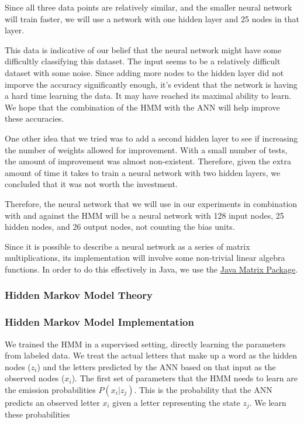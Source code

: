 \documentclass[11pt,a4paper,twocolumn]{article}
\begin{document}
Since all three data points are relatively similar, and the smaller neural
network will train faster, we will use a network with one hidden layer and 25 nodes
in that layer.

This data is indicative of our belief that the neural network might have some
difficultly classifying this dataset. The input seems to be a relatively
difficult dataset with some noise. Since adding more nodes to the hidden layer
did not imporve the accuracy significantly enough, it's evident that the
network is having a hard time learning the data. It may have reached its
maximal ability to learn. We hope that the combination of the HMM with the ANN
will help improve these accuracies.

One other idea that we tried was to add a second hidden layer to see if
increasing the number of weights allowed for improvement. With a small number
of tests, the amount of improvement was almost non-existent. Therefore, given
the extra amount of time it takes to train a neural network with two hidden
layers, we concluded that it was not worth the investment.

Therefore, the neural network that we will use in our experiments in
combination with and against the HMM will be a neural network with 128 input
nodes, 25 hidden nodes, and 26 output nodes, not counting the bias units.

Since it is possible to describe a neural network as a series of matrix multiplications, its
implementation will involve some non-trivial linear algebra functions. In order to do this
effectively in Java, we use the \href{http://math.nist.gov/javanumerics/jama/}{Java Matrix Package}.


\subsubsection*{Hidden Markov Model Theory}


\subsubsection*{Hidden Markov Model Implementation}

We trained the HMM in a supervised setting, directly learning the parameters
from labeled data. We treat the actual letters that make up a word as the
hidden nodes ($z_i$) and the letters predicted by the ANN based on that
input as the observed nodes ($x_i$). The first set of parameters that the HMM
needs to learn are the emission probabilities $P(x_i | z_j)$. This is the probability
that the ANN predicts an observed letter $x_i$ given a letter representing
the state $z_j$. We learn these probabilities 
\end{document}
